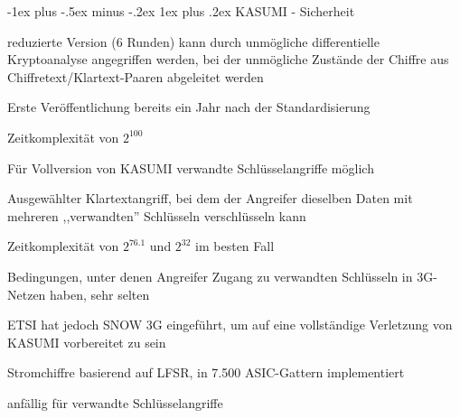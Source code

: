\documentclass[a4paper]{article}
\makeatletter
\renewcommand{\subsubsection}{\@startsection{subsubsection}{3}{0mm}%
 {-1ex plus -.5ex minus -.2ex}%
 {1ex plus .2ex}%
 {\normalfont\small\bfseries}}
\makeatother
\begin{document}
\begin{multicols}{3}
      \subsubsection{KASUMI - Sicherheit}
      \begin{itemize*}
            \item reduzierte Version (6 Runden) kann durch unmögliche differentielle Kryptoanalyse angegriffen werden, bei der unmögliche Zustände der Chiffre aus Chiffretext/Klartext-Paaren abgeleitet werden
            \begin{itemize*}
                  \item Erste Veröffentlichung bereits ein Jahr nach der Standardisierung
                  \item Zeitkomplexität von $2^{100}$
            \end{itemize*}
            \item Für Vollversion von KASUMI verwandte Schlüsselangriffe möglich
            \begin{itemize*}
                  \item Ausgewählter Klartextangriff, bei dem der Angreifer dieselben Daten mit mehreren ,,verwandten'' Schlüsseln verschlüsseln kann
                  \item Zeitkomplexität von $2^{76.1}$ und $2^{32}$ im besten Fall
                  \item Bedingungen, unter denen Angreifer Zugang zu verwandten Schlüsseln in 3G-Netzen haben, sehr selten
            \end{itemize*}
            \item ETSI hat jedoch SNOW 3G eingeführt, um auf eine vollständige Verletzung von KASUMI vorbereitet zu sein
            \begin{itemize*}
                  \item Stromchiffre basierend auf LFSR, in 7.500 ASIC-Gattern implementiert
                  \item anfällig für verwandte Schlüsselangriffe
            \end{itemize*}
      \end{itemize*}


\end{multicols}
\end{document}
